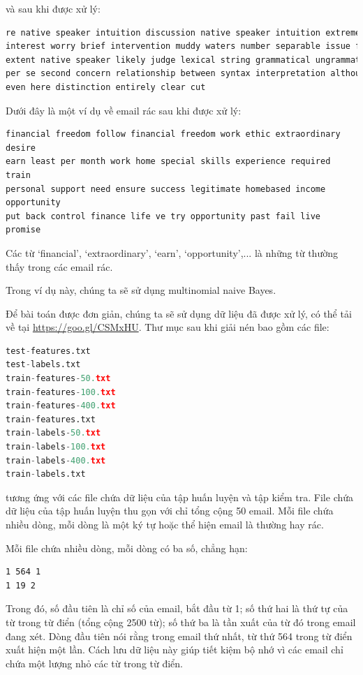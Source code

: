 \newpage
và {sau khi được xử lý}:

\begin{lstlisting}[language=Python]
re native speaker intuition discussion native speaker intuition extremely
interest worry brief intervention muddy waters number separable issue first
extent native speaker likely judge lexical string grammatical ungrammatical
per se second concern relationship between syntax interpretation although
even here distinction entirely clear cut
\end{lstlisting}

Dưới đây là một ví dụ về {email rác sau khi được xử lý}:

\begin{lstlisting}
financial freedom follow financial freedom work ethic extraordinary desire
earn least per month work home special skills experience required train
personal support need ensure success legitimate homebased income opportunity
put back control finance life ve try opportunity past fail live promise
\end{lstlisting}

Các từ `financial',
`extraordinary', `earn', `opportunity',... là những từ thường thấy trong các email rác.

Trong ví dụ này, chúng ta sẽ sử dụng multinomial naive Bayes.

Để bài toán được đơn giản, chúng ta sẽ sử dụng dữ liệu đã được xử lý, có thể tải về tại \url{https://goo.gl/CSMxHU}. Thư mục sau khi giải nén bao gồm các file:
\begin{lstlisting}[language=Python]
test-features.txt
test-labels.txt
train-features-50.txt
train-features-100.txt
train-features-400.txt
train-features.txt
train-labels-50.txt
train-labels-100.txt
train-labels-400.txt
train-labels.txt
\end{lstlisting}

tương ứng với các file chứa dữ liệu của tập huấn luyện và tập kiểm tra. File
 chứa dữ liệu của tập huấn luyện thu gọn với
chỉ tổng cộng 50 email. Mỗi file  chứa nhiều dòng, mỗi
dòng là một ký tự  hoặc  thể hiện email là thường hay rác.

Mỗi file  chứa nhiều dòng, mỗi dòng có ba số, chẳng hạn:
\begin{lstlisting}
1 564 1
1 19 2
\end{lstlisting}
Trong đó, số đầu tiên là chỉ số của email, bắt đầu từ 1; số thứ hai là thứ tự
của từ trong từ điển (tổng cộng 2500 từ); số thứ ba là tần xuất của từ đó trong
email đang xét. Dòng đầu tiên nói rằng trong email thứ nhất, từ thứ 564 trong từ
điển xuất hiện một lần. Cách lưu dữ liệu này giúp tiết kiệm bộ nhớ vì
các email chỉ chứa một lượng nhỏ các từ trong từ điển.

